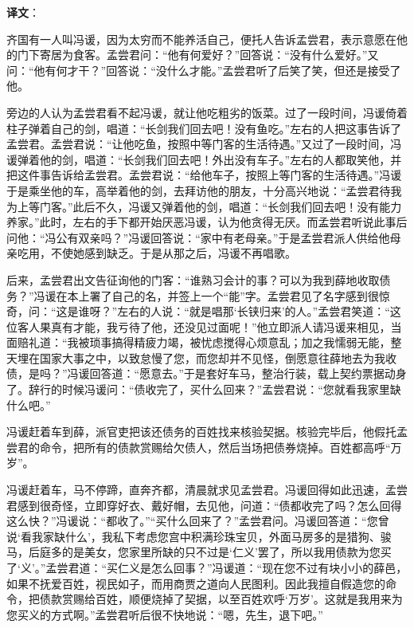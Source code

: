 \documentclass[12pt,UTF-8,openany,a4]{ctexbook}
\begin{document}
\newpage

\begin{Large}
   \noindent \textbf{译文}：
\end{Large}

\vspace{1em}

\begin{large}\yiwen
    
    齐国有一人叫冯谖，因为太穷而不能养活自己，便托人告诉孟尝君，表示意愿在他的门下寄居为食客。孟尝君问：“他有何爱好？”回答说：“没有什么爱好。”又问：“他有何才干？”回答说：“没什么才能。”孟尝君听了后笑了笑，但还是接受了他。
    
    旁边的人认为孟尝君看不起冯谖，就让他吃粗劣的饭菜。过了一段时间，冯谖倚着柱子弹着自己的剑，唱道：“长剑我们回去吧！没有鱼吃。”左右的人把这事告诉了孟尝君。孟尝君说：“让他吃鱼，按照中等门客的生活待遇。”又过了一段时间，冯谖弹着他的剑，唱道：“长剑我们回去吧！外出没有车子。”左右的人都取笑他，并把这件事告诉给孟尝君。孟尝君说：“给他车子，按照上等门客的生活待遇。”冯谖于是乘坐他的车，高举着他的剑，去拜访他的朋友，十分高兴地说：“孟尝君待我为上等门客。”此后不久，冯谖又弹着他的剑，唱道：“长剑我们回去吧！没有能力养家。”此时，左右的手下都开始厌恶冯谖，认为他贪得无厌。而孟尝君听说此事后问他：“冯公有双亲吗？”冯谖回答说：“家中有老母亲。”于是孟尝君派人供给他母亲吃用，不使她感到缺乏。于是从那之后，冯谖不再唱歌。
    
    后来，孟尝君出文告征询他的门客：“谁熟习会计的事？可以为我到薛地收取债务？”冯谖在本上署了自己的名，并签上一个“能”字。孟尝君见了名字感到很惊奇，问：“这是谁呀？”左右的人说：“就是唱那‘长铗归来’的人。”孟尝君笑道：“这位客人果真有才能，我亏待了他，还没见过面呢！”他立即派人请冯谖来相见，当面赔礼道：“我被琐事搞得精疲力竭，被忧虑搅得心烦意乱；加之我懦弱无能，整天埋在国家大事之中，以致怠慢了您，而您却并不见怪，倒愿意往薛地去为我收债，是吗？”冯谖回答道：“愿意去。”于是套好车马，整治行装，载上契约票据动身了。辞行的时候冯谖问：“债收完了，买什么回来？”孟尝君说：“您就看我家里缺什么吧。”
    
    冯谖赶着车到薛，派官吏把该还债务的百姓找来核验契据。核验完毕后，他假托孟尝君的命令，把所有的债款赏赐给欠债人，然后当场把债券烧掉。百姓都高呼“万岁”。
    
    冯谖赶着车，马不停蹄，直奔齐都，清晨就求见孟尝君。冯谖回得如此迅速，孟尝君感到很奇怪，立即穿好衣、戴好帽，去见他，问道：“债都收完了吗？怎么回得这么快？”冯谖说：“都收了。”“买什么回来了？”孟尝君问。冯谖回答道：“您曾说‘看我家缺什么’，我私下考虑您宫中积满珍珠宝贝，外面马房多的是猎狗、骏马，后庭多的是美女，您家里所缺的只不过是‘仁义’罢了，所以我用债款为您买了‘义’。”孟尝君道：“买仁义是怎么回事？”冯谖道：“现在您不过有块小小的薛邑，如果不抚爱百姓，视民如子，而用商贾之道向人民图利。因此我擅自假造您的命令，把债款赏赐给百姓，顺便烧掉了契据，以至百姓欢呼‘万岁’。这就是我用来为您买义的方式啊。”孟尝君听后很不快地说：“嗯，先生，退下吧。”
    

\end{large}
\end{document}
